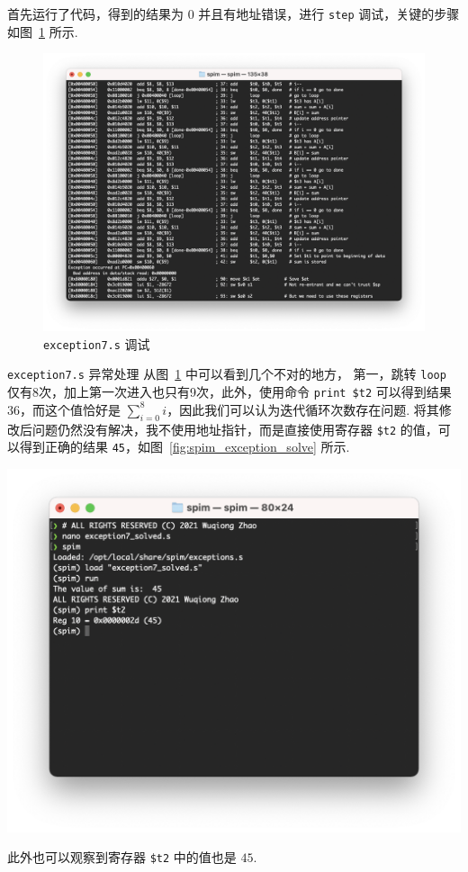 \documentclass[11pt]{SEU-Digital-Report}
\begin{document}
      首先运行了代码，得到的结果为 $0$ 并且有地址错误，进行 \texttt{step} 调试，关键的步骤如图~\ref{fig:spim_exception_debug} 所示.
      \begin{figure}[h!]
        \centering
        \includegraphics[width=.75\linewidth]{fig/spim_exception_debug.png}
        \caption{\texttt{exception7.s} 调试}
        \label{fig:spim_exception_debug}
      \end{figure}

      \begin{analyze}{\texttt{exception7.s} 异常处理}{}      
        从图~\ref{fig:spim_exception_debug} 中可以看到几个不对的地方，
        第一，跳转 \texttt{loop} 仅有8次，加上第一次进入也只有9次，此外，使用命令 \texttt{print \$t2} 可以得到结果 $36$，而这个值恰好是 $\sum_{i=0}^8i$，因此我们可以认为迭代循环次数存在问题.
        将其修改后问题仍然没有解决，我不使用地址指针，而是直接使用寄存器 \texttt{\$t2} 的值，可以得到正确的结果 \texttt{45}，如图~\ref{fig:spim_exception_solve} 所示.
        \begin{center}
          \includegraphics[width=.65\linewidth]{fig/spim_exception_solve.png}
          \label{fig:spim_exception_solve}
        \end{center}
        此外也可以观察到寄存器 \texttt{\$t2} 中的值也是 $45$.
      \end{analyze}
\end{document}
